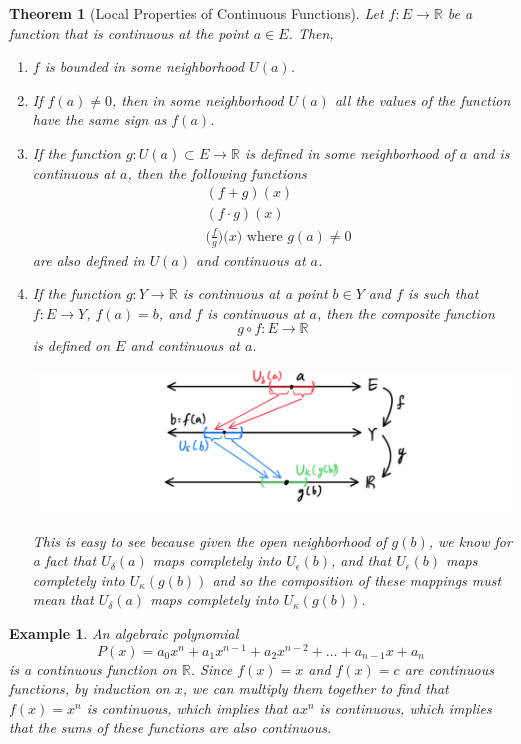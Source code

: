 \documentclass{article}
\newtheorem{theorem}{Theorem}[section]
\newtheorem{example}{Example}[section]
\theoremstyle{remark}
\theoremstyle{definition}
\begin{document}
\begin{theorem}[Local Properties of Continuous Functions]
Let $f: E \longrightarrow \mathbb{R}$ be a function that is continuous at the point $a \in E$. Then, 
\begin{enumerate}
    \item $f$ is bounded in some neighborhood $U(a)$. 
    \item If $f(a) \neq 0$, then in some neighborhood $U(a)$ all the values of the function have the same sign as $f(a)$. 
    \item If the function $g: U(a) \subset E \longrightarrow \mathbb{R}$ is defined in some neighborhood of $a$ and is continuous at $a$, then the following functions 
    \begin{align*}
        & (f + g) (x) \\
        & (f \cdot g) (x) \\
        & \bigg( \frac{f}{g} \bigg) \big( x \big) \text{ where } g(a) \neq 0
    \end{align*}
    are also defined in $U(a)$ and continuous at $a$. 
    \item If the function $g: Y \longrightarrow \mathbb{R}$ is continuous at a point $b \in Y$ and $f$ is such that $f: E \longrightarrow Y$, $f(a) = b$, and $f$ is continuous at $a$, then the composite function 
    \[g \circ f: E \longrightarrow \mathbb{R}\]
    is defined on $E$ and continuous at $a$. 
    \begin{center}
        \includegraphics[scale=0.3]{img/Composition_Function_Continuous.PNG}
    \end{center}
    This is easy to see because given the open neighborhood of $g(b)$, we know for a fact that $U_\delta (a)$ maps completely into $U_\epsilon (b)$, and that $U_\epsilon (b)$ maps completely into $U_\kappa (g(b))$ and so the composition of these mappings must mean that $U_\delta (a)$ maps completely into $U_\kappa (g(b))$. 
\end{enumerate}
\end{theorem}

\begin{example}
An algebraic polynomial 
\[P(x) = a_0 x^n + a_1 x^{n-1} + a_2 x^{n-2} + \ldots + a_{n-1} x + a_n\]
is a continuous function on $\mathbb{R}$. Since $f(x) = x$ and $f(x) = c$ are continuous functions, by induction on $x$, we can multiply them together to find that $f(x) = x^n$ is continuous, which implies that $a x^n$ is continuous, which implies that the sums of these functions are also continuous. 
\end{example}
\end{document}
